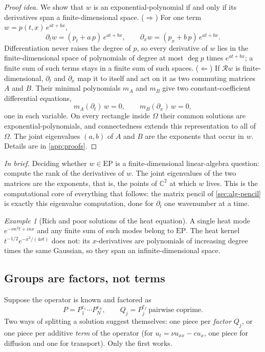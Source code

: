 \documentclass[11pt]{article}
\theoremstyle{plain}
\theoremstyle{definition}
\theoremstyle{remark}
\newtheorem{example}[theorem]{Example}
\newcommand{\C}{\mathbb{C}}
\newcommand{\ring}{\mathcal{R}}            %
\newcommand{\EP}{\mathrm{EP}}               %
\newcommand{\inbrief}[1]{\par\smallskip\noindent\emph{In brief.} #1\par\smallskip}
\begin{document}
\begin{proof}[Proof idea]
We show that $w$ is an exponential-polynomial if and only if its derivatives span a finite-dimensional
space. ($\Rightarrow$) For one term $w=p(t,x)\,e^{at+bx}$,
\[
  \partial_tw=(p_t+a\,p)\,e^{at+bx},\qquad \partial_xw=(p_x+b\,p)\,e^{at+bx}.
\]
Differentiation never raises the degree of $p$, so every derivative of $w$ lies in the finite-dimensional space
of polynomials of degree at most $\deg p$ times $e^{at+bx}$; a finite sum of such terms stays in a finite sum of
such spaces. ($\Leftarrow$) If $\ring w$ is finite-dimensional, $\partial_t$ and $\partial_x$ map it to itself and act
on it as two commuting matrices $A$ and $B$. Their minimal polynomials $m_A$ and $m_B$ give two
constant-coefficient differential equations,
\[
  m_A(\partial_t)\,w=0,\qquad m_B(\partial_x)\,w=0,
\]
one in each variable. On every rectangle inside $\Omega$ their common solutions are exponential-polynomials, and
connectedness extends this representation to all of $\Omega$. The joint eigenvalues $(a,b)$ of $A$ and $B$ are
the exponents that occur in $w$. Details are in \cref{app:proofs}.
\end{proof}

\inbrief{Deciding whether $w\in\EP$ is a finite-dimensional linear-algebra question: compute the rank
of the derivatives of $w$. The joint eigenvalues of the two matrices are the exponents, that is, the
points of $\C^2$ at which $w$ lives. This is the computational core of everything that follows: the
matrix pencil of \cref{sec:alg-pencil} is exactly this eigenvalue computation, done for $\partial_t$
one wavenumber at a time.}

\begin{example}[Rich and poor solutions of the heat equation]\label{ex:heat-rich-poor}
A single heat mode $e^{-\nu\kappa^2t+i\kappa x}$ and any finite sum of such modes belong to $\EP$.
The heat kernel $t^{-1/2}e^{-x^2/(4\nu t)}$ does not: its $x$-derivatives are polynomials of
increasing degree times the same Gaussian, so they span an infinite-dimensional space.
\end{example}



\subsection{Groups are factors, not terms}\label{sec:factor}
Suppose the operator is known and factored as
\begin{equation}\label{eq:factored}
  P=P_1^{e_1}\cdots P_N^{e_N},\qquad Q_j=P_j^{e_j}\ \text{pairwise coprime}.
\end{equation}
Two ways of splitting a solution suggest themselves: one piece per \emph{factor} $Q_j$, or one piece
per additive \emph{term} of the operator (for $u_t=\nu u_{xx}-cu_x$, one piece for diffusion and one
for transport). Only the first works.
\end{document}
